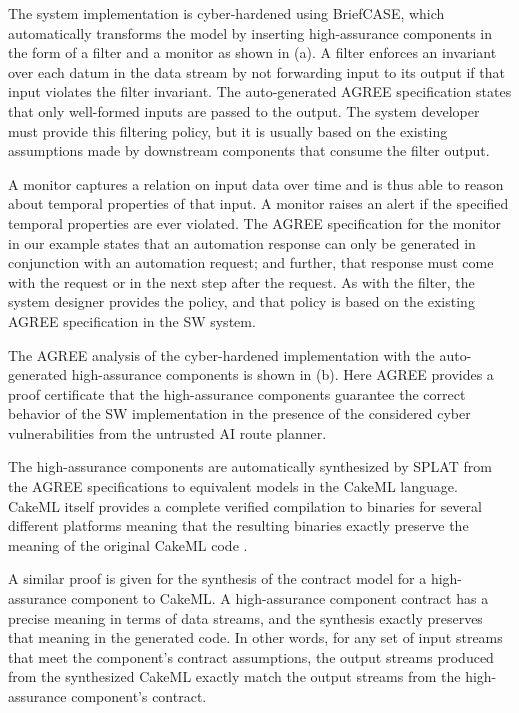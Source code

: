 The system implementation is cyber-hardened using BriefCASE, which automatically transforms the model by inserting high-assurance components in the form of a filter and a monitor as shown in (a). A filter enforces an invariant over each datum in the data stream by not forwarding input to its output if that input violates the filter invariant. The auto-generated AGREE specification states that only well-formed inputs are passed to the output. The system developer must provide this filtering policy, but it is usually based on the existing assumptions made by downstream components that consume the filter output. 

A monitor captures a relation on input data over time and is thus able to reason about temporal properties of that input. A monitor raises an alert if the specified temporal properties are ever violated. The AGREE specification for the monitor in our example states that an automation response can only be generated in conjunction with an automation request; and further, that response must come with the request or in the next step after the request. As with the filter, the system designer provides the policy, and that policy is based on the existing AGREE specification in the SW system.

The AGREE analysis of the cyber-hardened implementation with the auto-generated high-assurance components is shown in (b). Here AGREE provides a proof certificate that the high-assurance components guarantee the correct behavior of the SW implementation in the presence of the considered cyber vulnerabilities from the untrusted AI route planner.

The high-assurance components are automatically synthesized by SPLAT from the AGREE specifications to equivalent models in the CakeML language. CakeML itself provides a complete verified compilation to binaries for several different platforms meaning that the resulting binaries exactly preserve the meaning of the original CakeML code \cite{cakeml}. 

A similar proof is given for the synthesis of the contract model for a high-assurance component to CakeML. A high-assurance component contract has a precise meaning in terms of data streams, and the synthesis exactly preserves that meaning in the generated code. In other words, for any set of input streams that meet the component's contract assumptions, the output streams produced from the synthesized CakeML exactly match the output streams from the high-assurance component's contract. 

